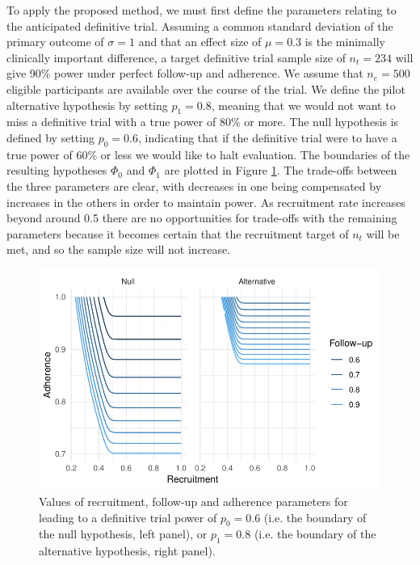 \documentclass[AMA,STIX1COL]{WileyNJD-v2}
\begin{document}
To apply the proposed method, we must first define the parameters relating to the anticipated definitive trial. Assuming a common standard deviation of the primary outcome of $\sigma=1$ and that an effect size of $\mu = 0.3$ is the minimally clinically important difference, a target definitive trial sample size of $n_t = 234$ will give 90\% power under perfect follow-up and adherence. We assume that $n_e = 500$ eligible participants are available over the course of the trial. We define the pilot alternative hypothesis by setting $p_1 = 0.8$, meaning that we would not want to miss a definitive trial with a true power of 80\% or more. The null hypothesis is defined by setting $p_0 = 0.6$, indicating that if the definitive trial were to have a true power of 60\% or less we would like to halt evaluation. The boundaries of the resulting hypotheses $\Phi_0$ and $\Phi_1$ are plotted in Figure \ref{fig:hyps}. The trade-offs between the three parameters are clear, with decreases in one being compensated by increases in the others in order to maintain power. As recruitment rate increases beyond around 0.5 there are no opportunities for trade-offs with the remaining parameters because it becomes certain that the recruitment target of $n_t$ will be met, and so the sample size will not increase.

\begin{figure}
\centering
\includegraphics[scale=0.8]{./Figures/hyps.pdf}
\caption{Values of recruitment, follow-up and adherence parameters for leading to a definitive trial power of $p_0 = 0.6$ (i.e. the boundary of the null hypothesis, left panel), or $p_1 = 0.8$ (i.e. the boundary of the alternative hypothesis, right panel).}
\label{fig:hyps}
\end{figure}
\end{document}
